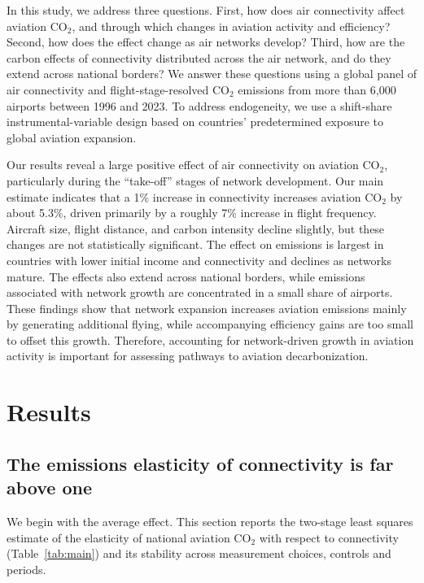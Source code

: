 \documentclass[12pt]{extarticle}
\begin{document}
In this study, we address three questions. First, how does air
connectivity affect aviation CO$_2$, and through which changes in
aviation activity and efficiency? Second, how does the effect change as
air networks develop? Third, how are the carbon effects of connectivity
distributed across the air network, and do they extend across national
borders? We answer these questions using a global panel of air
connectivity and flight-stage-resolved CO$_2$ emissions from more than
6{,}000 airports between 1996 and 2023. To address endogeneity, we use a
shift-share instrumental-variable design based on countries'
predetermined exposure to global aviation expansion.

Our results reveal a large positive effect of air connectivity on
aviation CO$_2$, particularly during the ``take-off'' stages of network
development. Our main estimate indicates that a 1\% increase in
connectivity increases aviation CO$_2$ by about 5.3\%, driven primarily
by a roughly 7\% increase in flight frequency. Aircraft size, flight
distance, and carbon intensity decline slightly, but these changes are
not statistically significant. The effect on emissions is largest in
countries with lower initial income and connectivity and declines as
networks mature. The effects also extend across national borders, while
emissions associated with network growth are concentrated in a small
share of airports. These findings show that network expansion increases
aviation emissions mainly by generating additional flying, while
accompanying efficiency gains are too small to offset this growth.
Therefore, accounting for network-driven growth in aviation activity is
important for assessing pathways to aviation decarbonization.

\section*{Results}
\subsection*{The emissions elasticity of connectivity is far above one}
We begin with the average effect. This section reports the two-stage
least squares estimate of the elasticity of national aviation CO$_2$ with
respect to connectivity (Table~\ref{tab:main}) and its stability across
measurement choices, controls and periods.
\end{document}
